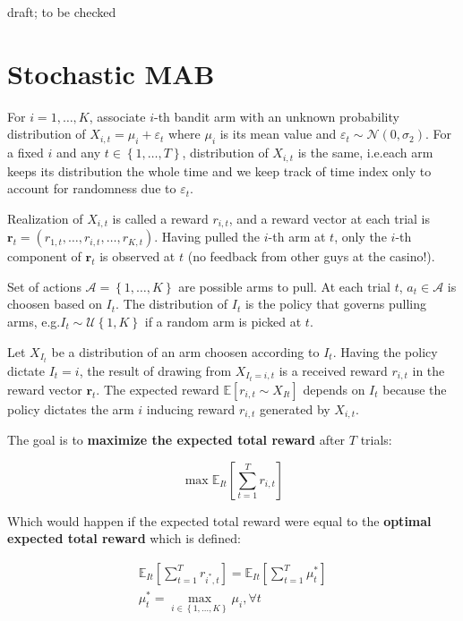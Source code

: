 \documentclass[12pt,english]{article}
\begin{document}
draft; to be checked

\section{Stochastic MAB}

For \(i=1,\dots,K\), associate \(i\)-th bandit arm with an unknown probability distribution of \(X_{i,t} = \mu_i + \varepsilon_t\) where \(\mu_i\) is its mean value and \(\varepsilon_t \sim \mathcal{N}\left( 0, \sigma_2 \right) \). For a fixed \(i\) and any \(t \in \left\{ 1,\dots,T \right\} \), distribution of \(X_{i,t}\) is the same, i.e.\@ each arm keeps its distribution the whole time and we keep track of time index only to account for randomness due to \(\varepsilon_t\). 

Realization of \(X_{i,t}\) is called a reward \(r_{i,t}\), and a reward vector at each trial is \(\mathbf{r}_t = \left( r_{1,t},\dots,r_{i,t},\dots,r_{K,t} \right) \). Having pulled the \(i\)-th arm at \(t\), only the \(i\)-th component of \(\mathbf{r}_t\) is observed at \(t\) (no feedback from other guys at the casino!).

Set of actions \(\mathcal{A}=\left\{ 1,\dots,K \right\} \) are possible arms to pull. At each trial \(t\), \(a_{t} \in \mathcal{A}\) is choosen based on \(I_{t}\). The distribution of \(I_{t}\) is the policy that governs pulling arms, e.g.\@ \(I_{t} \sim \mathcal{U}\left\{ 1,K \right\} \) if a random arm is picked at \(t\). 

Let \(X_{I_t}\) be a distribution of an arm choosen according to \(I_t\). Having the policy dictate \(I_{t} = i\), the result of drawing from \(X_{I_t=i,t}\) is a received reward \(r_{i,t}\) in the reward vector \(\mathbf{r}_{t}\). The expected reward \(\mathbb{E} \left[  r_{i,t} \sim X_{It}\right] \) depends on \(I_t\) because the policy dictates the arm \(i\) inducing reward \(r_{i,t}\) generated by \(X_{i,t}\).

The goal is to \textbf{maximize the expected total reward} after \(T\) trials:

\begin{equation}
\max \mathbb{E}_{It} \left[ \sum_{t=1}^{T} r_{i,t} \right] 	
\end{equation}

Which would happen if the expected total reward were equal to the \textbf{optimal expected total reward} which is defined:

\begin{gather} \label{eq-optimal-rew}
\mathbb{E}_{It} \left[ \sum_{t=1}^{T} r_{i^{\ast},t} \right] = \mathbb{E}_{It} \left[ \sum_{t=1}^{T} \mu_{t}^{\ast} \right] \\
\mu_{t}^{\ast} = \max_{i \in \left\{ 1,\dots,K \right\} } \mu_{i}, \forall t
\end{gather}
\end{document}

